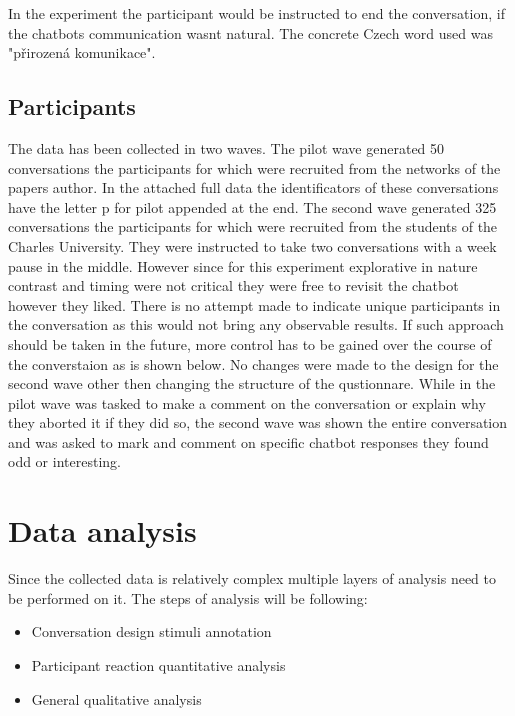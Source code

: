 In the experiment the participant would be instructed to end the conversation,
if the chatbots communication wasnt natural.
The concrete Czech word used was "přirozená komunikace".

\subsection{Participants}
The data has been collected in two waves.
The pilot wave generated 50 conversations
the participants for which were recruited from the networks of the papers author.
In the attached full data
the identificators of these conversations have
the letter p for pilot appended at the end.
The second wave generated 325 conversations
the participants for which were recruited from the students of the Charles University.
They were instructed to take two conversations with a week pause in the middle.
However since for this experiment explorative in nature contrast and timing were not critical
they were free to revisit the chatbot however they liked.
There is no attempt made to indicate unique participants in the conversation as
this would not bring any observable results.
If such approach should be taken in the future,
more control has to be gained over the course of the converstaion
as is shown below.
No changes were made to the design for the second wave other then changing the structure of the qustionnare.
While in the pilot wave was tasked to make a comment on the conversation or
explain why they aborted it if they did so,
the second wave was shown the entire conversation
and was asked to mark and comment on specific chatbot responses they found odd or interesting.

\section{Data analysis}

Since the collected data is relatively complex
multiple layers of analysis need to be performed on it.
The steps of analysis will be following:

\begin{itemize}
\item{Conversation design stimuli annotation}
\item{Participant reaction quantitative analysis}
\item{General qualitative analysis}
\end{itemize}

